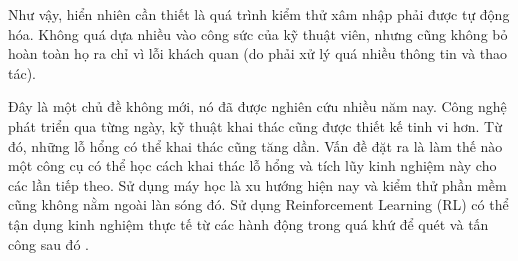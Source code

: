 Như vậy, hiển nhiên cần thiết là quá trình kiểm thử xâm nhập phải được tự động hóa. Không quá dựa nhiều vào công sức của kỹ thuật viên, nhưng cũng không bỏ hoàn toàn họ ra chỉ vì lỗi khách quan (do phải xử lý quá nhiều thông tin và thao tác).

Đây là một chủ đề không mới, nó đã được nghiên cứu nhiều năm nay. Công nghệ phát triển qua từng ngày, kỹ thuật khai thác cũng được thiết kế tinh vi hơn. Từ đó, những lỗ hổng có thể khai thác cũng tăng dần. Vấn đề đặt ra là làm thế nào một công cụ có thể học cách khai thác lỗ hổng và tích lũy kinh nghiệm này cho các lần tiếp theo. Sử dụng máy học là xu hướng hiện nay và kiểm thử  phần mềm cũng không nằm ngoài làn sóng đó. Sử dụng Reinforcement Learning (RL) có thể tận dụng kinh nghiệm thực tế từ các hành động trong quá khứ để quét và tấn công sau đó \cite{liu2020deep}. 








